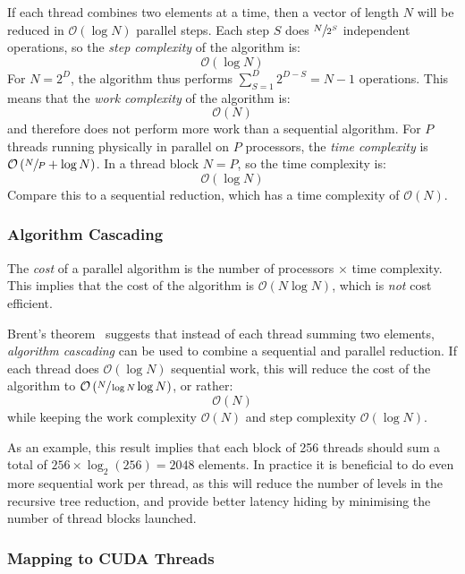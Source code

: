 If each thread combines two elements at a time, then a vector of length $N$ will
be reduced in $\mathcal{O}\left( \log N \right)$ parallel steps. Each step $S$
does $\sfrac{N}{2^S}$ independent operations, so the \emph{step
complexity} of the algorithm is:
\[
\mathcal{O}\left( \log N \right)
\]
For $N=2^{D}$, the algorithm thus performs $\sum_{S=1}^{D}2^{D-S} = N - 1$
operations. This means that the \emph{work complexity} of
the algorithm is:
\[
\mathcal{O}\left( N \right)
\]
and therefore does not perform more work than a sequential algorithm. For $P$
threads running physically in parallel on $P$ processors, the \emph{time
complexity} is $\mathcal{O}\left( \sfrac{N}{P} + \log N
\right)$. In a thread block $N = P$, so the time complexity is:
\[
\mathcal{O}\left( \log N \right)
\]
Compare this to a sequential reduction, which has a time complexity of
$\mathcal{O}\left( N \right)$.

\subsubsection{Algorithm Cascading}
\label{sec:algorithm_cascading}

The \emph{cost} of a parallel algorithm is the number of processors $\times$
time complexity. This implies that the cost of the algorithm is
$\mathcal{O}\left( N \log N \right)$, which is \emph{not} cost efficient.

Brent's theorem~\cite{Chatterjee:2009vh} suggests that instead of each thread
summing two elements, \emph{algorithm cascading} can be used to combine a
sequential and parallel reduction. If each thread does $\mathcal{O}\left( \log N
\right)$ sequential work, this will reduce the cost of the algorithm to
$\mathcal{O}\left( \sfrac{N}{\log N} \log N \right)$, or rather:
\[
\mathcal{O}\left( N \right)
\]
while keeping the work complexity $\mathcal{O}\left( N \right)$ and step
complexity $\mathcal{O}\left( \log N \right)$.

As an example, this result implies that each block of 256 threads should sum a
total of $256 \times \log_2 \left( 256 \right) = 2048$ elements. In practice it
is beneficial to do even more sequential work per thread, as this will reduce
the number of levels in the recursive tree reduction, and provide better latency
hiding by minimising the number of thread blocks launched.


\subsubsection{Mapping to CUDA Threads}

